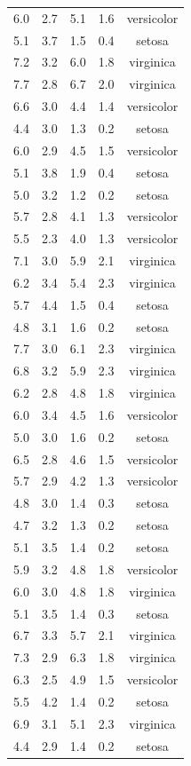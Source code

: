 \documentclass[
]{article}
\begin{document}
\begin{longtable}{rrrrc}
6.0 & 2.7 & 5.1 & 1.6 & versicolor \\ 
5.1 & 3.7 & 1.5 & 0.4 & setosa \\ 
7.2 & 3.2 & 6.0 & 1.8 & virginica \\ 
7.7 & 2.8 & 6.7 & 2.0 & virginica \\ 
6.6 & 3.0 & 4.4 & 1.4 & versicolor \\ 
4.4 & 3.0 & 1.3 & 0.2 & setosa \\ 
6.0 & 2.9 & 4.5 & 1.5 & versicolor \\ 
5.1 & 3.8 & 1.9 & 0.4 & setosa \\ 
5.0 & 3.2 & 1.2 & 0.2 & setosa \\ 
5.7 & 2.8 & 4.1 & 1.3 & versicolor \\ 
5.5 & 2.3 & 4.0 & 1.3 & versicolor \\ 
7.1 & 3.0 & 5.9 & 2.1 & virginica \\ 
6.2 & 3.4 & 5.4 & 2.3 & virginica \\ 
5.7 & 4.4 & 1.5 & 0.4 & setosa \\ 
4.8 & 3.1 & 1.6 & 0.2 & setosa \\ 
7.7 & 3.0 & 6.1 & 2.3 & virginica \\ 
6.8 & 3.2 & 5.9 & 2.3 & virginica \\ 
6.2 & 2.8 & 4.8 & 1.8 & virginica \\ 
6.0 & 3.4 & 4.5 & 1.6 & versicolor \\ 
5.0 & 3.0 & 1.6 & 0.2 & setosa \\ 
6.5 & 2.8 & 4.6 & 1.5 & versicolor \\ 
5.7 & 2.9 & 4.2 & 1.3 & versicolor \\ 
4.8 & 3.0 & 1.4 & 0.3 & setosa \\ 
4.7 & 3.2 & 1.3 & 0.2 & setosa \\ 
5.1 & 3.5 & 1.4 & 0.2 & setosa \\ 
5.9 & 3.2 & 4.8 & 1.8 & versicolor \\ 
6.0 & 3.0 & 4.8 & 1.8 & virginica \\ 
5.1 & 3.5 & 1.4 & 0.3 & setosa \\ 
6.7 & 3.3 & 5.7 & 2.1 & virginica \\ 
7.3 & 2.9 & 6.3 & 1.8 & virginica \\ 
6.3 & 2.5 & 4.9 & 1.5 & versicolor \\ 
5.5 & 4.2 & 1.4 & 0.2 & setosa \\ 
6.9 & 3.1 & 5.1 & 2.3 & virginica \\ 
4.4 & 2.9 & 1.4 & 0.2 & setosa \\ 

\end{longtable}
\end{document}
